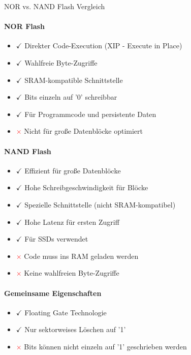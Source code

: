 \begin{KR}{NOR vs. NAND Flash Vergleich}\\
    \paragraph{NOR Flash}
    \begin{itemize}
        \item \textcolor{frog}{$\checkmark$} Direkter Code-Execution (XIP - Execute in Place)
        \item \textcolor{frog}{$\checkmark$} Wahlfreie Byte-Zugriffe
        \item \textcolor{frog}{$\checkmark$} SRAM-kompatible Schnittstelle
        \item \textcolor{frog}{$\checkmark$} Bits einzeln auf '0' schreibbar
        \item \textcolor{frog}{$\checkmark$} Für Programmcode und persistente Daten
        \item \textcolor{red}{$\times$} Nicht für große Datenblöcke optimiert
    \end{itemize}
    
    \paragraph{NAND Flash}
    \begin{itemize}
        \item \textcolor{frog}{$\checkmark$} Effizient für große Datenblöcke
        \item \textcolor{frog}{$\checkmark$} Hohe Schreibgeschwindigkeit für Blöcke
        \item \textcolor{frog}{$\checkmark$} Spezielle Schnittstelle (nicht SRAM-kompatibel)
        \item \textcolor{frog}{$\checkmark$} Hohe Latenz für ersten Zugriff
        \item \textcolor{frog}{$\checkmark$} Für SSDs verwendet
        \item \textcolor{red}{$\times$} Code muss ins RAM geladen werden
        \item \textcolor{red}{$\times$} Keine wahlfreien Byte-Zugriffe
    \end{itemize}
    
    \paragraph{Gemeinsame Eigenschaften}
    \begin{itemize}
        \item \textcolor{frog}{$\checkmark$} Floating Gate Technologie
        \item \textcolor{frog}{$\checkmark$} Nur sektorweises Löschen auf '1'
        \item \textcolor{red}{$\times$} Bits können nicht einzeln auf '1' geschrieben werden
    \end{itemize}
\end{KR}

